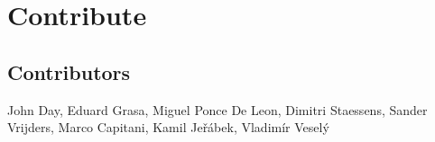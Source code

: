 \section{Contribute}
\label{sec:contribute}


\subsection{Contributors}

{\contribfont
    John Day,
    Eduard Grasa,
    Miguel Ponce De Leon,
    Dimitri Staessens,
    Sander Vrijders,
    Marco Capitani,
    Kamil Je\v{r}\'{a}bek,
    Vladim\'{i}r Vesel\'{y}
}
